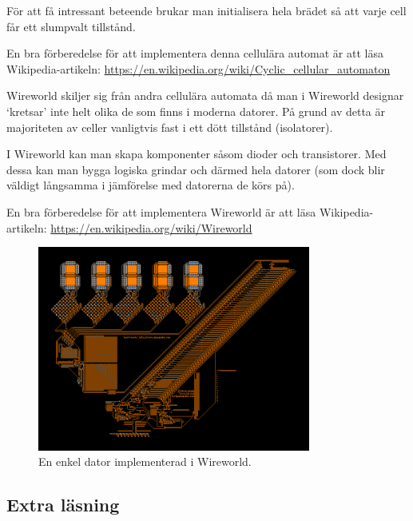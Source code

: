 För att få intressant beteende brukar man initialisera hela brädet så att varje cell får ett slumpvalt tillstånd.

En bra förberedelse för att implementera denna cellulära automat är att läsa Wikipedia-artikeln: \url{https://en.wikipedia.org/wiki/Cyclic_cellular_automaton}


Wireworld skiljer sig från andra cellulära automata då man i Wireworld designar `kretsar' inte helt olika de som finns i moderna datorer.
På grund av detta är majoriteten av celler vanligtvis fast i ett dött tillstånd (isolatorer).

I Wireworld kan man skapa komponenter såsom dioder och transistorer. Med dessa kan man bygga logiska grindar och därmed hela datorer (som dock blir väldigt långsamma i jämförelse med datorerna de körs på).

En bra förberedelse för att implementera Wireworld är att läsa Wikipedia-artikeln: \url{https://en.wikipedia.org/wiki/Wireworld}

\begin{figure}[h]
    \begin{center}
        \includegraphics[width=0.8\textwidth]{../img/w12-lab/wireworld_computer.png}
    \end{center}
    \caption{En enkel dator implementerad i Wireworld.\protect\footnotemark}
    \label{fig:threads:life:wireworld-computer}
\end{figure}


\subsection{Extra läsning}

